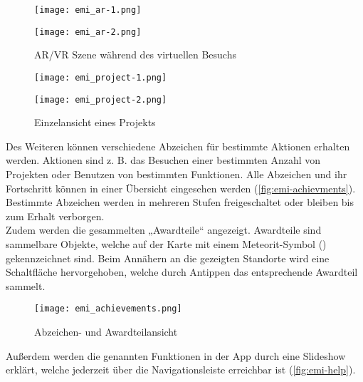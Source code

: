 \begin{figure}[htpb]
    \begin{minipage}{.5\textwidth}
        \centering
        \texttt{[image: emi\_ar-1.png]}
    \end{minipage}%
    \begin{minipage}{.5\textwidth}
        \centering
        \texttt{[image: emi\_ar-2.png]}
    \end{minipage}
    \caption{\ac{AR}/\ac{VR} Szene während des virtuellen Besuchs}
    \label{fig:emi-ar}
\end{figure}

\begin{figure}[htpb]
    \begin{minipage}{.5\textwidth}
        \centering
        \texttt{[image: emi\_project-1.png]}
    \end{minipage}%
    \begin{minipage}{.5\textwidth}
        \centering
        \texttt{[image: emi\_project-2.png]}
    \end{minipage}
    \caption{Einzelansicht eines Projekts}
    \label{fig:emi-project}
\end{figure}

Des Weiteren können verschiedene Abzeichen für bestimmte Aktionen erhalten
werden. Aktionen sind z. B. das Besuchen einer bestimmten Anzahl von Projekten
oder Benutzen von bestimmten Funktionen. Alle Abzeichen und ihr Fortschritt
können in einer Übersicht eingesehen werden (\autoref{fig:emi-achievments}).
Bestimmte Abzeichen werden in mehreren Stufen freigeschaltet oder bleiben bis
zum Erhalt verborgen. \\
Zudem werden die gesammelten „Awardteile“ angezeigt. Awardteile sind sammelbare
Objekte, welche auf der Karte mit einem Meteorit-Symbol
() gekennzeichnet sind. Beim Annähern an die
gezeigten Standorte wird eine Schaltfläche hervorgehoben, welche durch Antippen
das entsprechende Awardteil sammelt.

\begin{figure}[htpb]
    \centering
    \texttt{[image: emi\_achievements.png]}
    \caption{Abzeichen- und Awardteilansicht}
    \label{fig:emi-achievments}
\end{figure}

Außerdem werden die genannten Funktionen in der App durch eine Slideshow
erklärt, welche jederzeit über die Navigationsleiste erreichbar ist (\autoref{fig:emi-help}).

